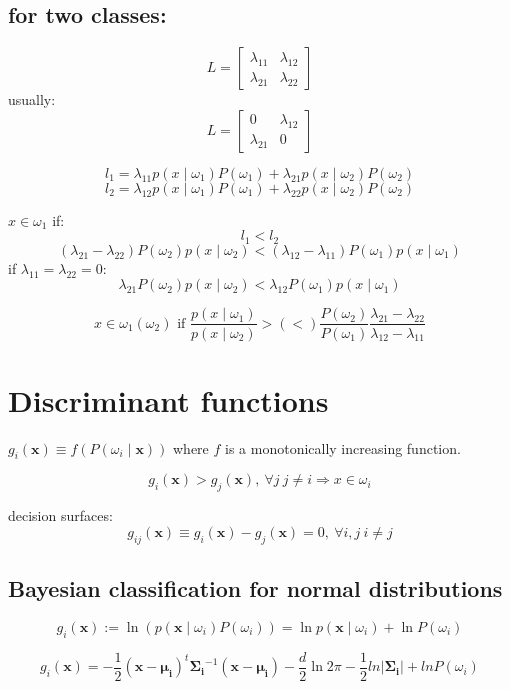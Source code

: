 \documentclass{report}
\begin{document}
\subsection*{for two classes:}
\[L = \begin{bmatrix}
	\lambda_{11} & \lambda_{12} \\
	\lambda_{21} & \lambda_{22}
\end{bmatrix}\]
usually:
\[L = \begin{bmatrix}
	0 & \lambda_{12} \\
	\lambda_{21} & 0
\end{bmatrix}\]

\[l_1 = \lambda_{11} p(x \mid \omega_1)P(\omega_1) + \lambda_{21} p(x \mid \omega_2)P(\omega_2)\]
\[l_2 = \lambda_{12} p(x \mid \omega_1)P(\omega_1) + \lambda_{22} p(x \mid \omega_2)P(\omega_2)\]

$x \in \omega_1$ if:
\[l_1 < l_2\]
\[(\lambda_{21}-\lambda_{22}) P(\omega_2) p(x \mid \omega_2) < (\lambda_{12}-\lambda_{11}) P(\omega_1) p(x \mid \omega_1)\]
if $\lambda_{11} = \lambda_{22} = 0$:
\[\lambda_{21} P(\omega_2) p(x \mid \omega_2) < \lambda_{12} P(\omega_1) p(x \mid \omega_1)\]

\[x \in \omega_1 (\omega_2) \text{ if } \frac{p(x \mid \omega_1)}{p(x \mid \omega_2)} > (<) \frac{P(\omega_2)}{P(\omega_1)}\frac{\lambda_{21}-\lambda_{22}}{\lambda_{12}-\lambda_{11}}\]

\section{Discriminant functions}
$g_i (\symbf{x}) \equiv f(P(\omega_i \mid \symbf{x}))$ where $f$ is a monotonically increasing function.

\[g_i(\symbf{x}) > g_j(\symbf{x}),\ \forall j\ j \neq i \Rightarrow x \in \omega_i\]

decision surfaces:
\[g_{ij}(\symbf{x}) \equiv g_i(\symbf{x}) - g_j(\symbf{x}) = 0,\ \forall i, j\ i \neq j\]

\subsection*{Bayesian classification for normal distributions}

\[g_i(\symbf{x}) := \ln (p(\symbf{x} \mid \omega_i) P(\omega_i)) = \ln p(\symbf{x} \mid \omega_i) + \ln P(\omega_i)\]

\[g_i(\symbf{x}) = -\frac{1}{2} (\symbf{x} - \symbf{\mu_i})^t \symbf{\Sigma_i}^{-1} (\symbf{x} - \symbf{\mu_i}) - \frac{d}{2}\ln2\pi - \frac{1}{2} ln |\symbf{\Sigma_i}| + ln P(\omega_i)\]
\end{document}
